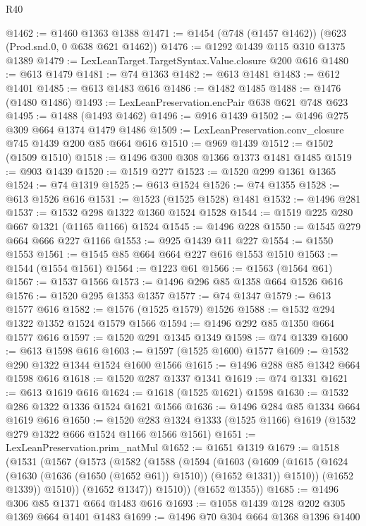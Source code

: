 \begin{lexlean}{R40}
\begin{coremodule}
@1462 := @1460 @1363 @1388
@1471 := @1454 (@748 (@1457 @1462)) (@623 (Prod.snd.{0, 0} @638 @621 @1462))
@1476 := @1292 @1439 @115 @310 @1375 @1389
@1479 := LexLeanTarget.TargetSyntax.Value.closure @200 @616
@1480 := @613 @1479
@1481 := @74 @1363
@1482 := @613 @1481
@1483 := @612 @1401
@1485 := @613 @1483 @616
@1486 := @1482 @1485
@1488 := @1476 (@1480 @1486)
@1493 := LexLeanPreservation.encPair @638 @621 @748 @623
@1495 := @1488 (@1493 @1462)
@1496 := @916 @1439
@1502 := @1496 @275 @309 @664 @1374 @1479 @1486
@1509 := LexLeanPreservation.conv_closure @745 @1439 @200 @85 @664 @616
@1510 := @969 @1439
@1512 := @1502 (@1509 @1510)
@1518 := @1496 @300 @308 @1366 @1373 @1481 @1485
@1519 := @903 @1439
@1520 := @1519 @277
@1523 := @1520 @299 @1361 @1365
@1524 := @74 @1319
@1525 := @613 @1524
@1526 := @74 @1355
@1528 := @613 @1526 @616
@1531 := @1523 (@1525 @1528) @1481
@1532 := @1496 @281
@1537 := @1532 @298 @1322 @1360 @1524 @1528
@1544 := @1519 @225 @280 @667 @1321 (@1165 @1166) @1524
@1545 := @1496 @228
@1550 := @1545 @279 @664 @666 @227 @1166
@1553 := @925 @1439 @11 @227
@1554 := @1550 @1553
@1561 := @1545 @85 @664 @664 @227 @616 @1553 @1510
@1563 := @1544 (@1554 @1561)
@1564 := @1223 @61
@1566 := @1563 (@1564 @61)
@1567 := @1537 @1566
@1573 := @1496 @296 @85 @1358 @664 @1526 @616
@1576 := @1520 @295 @1353 @1357
@1577 := @74 @1347
@1579 := @613 @1577 @616
@1582 := @1576 (@1525 @1579) @1526
@1588 := @1532 @294 @1322 @1352 @1524 @1579 @1566
@1594 := @1496 @292 @85 @1350 @664 @1577 @616
@1597 := @1520 @291 @1345 @1349
@1598 := @74 @1339
@1600 := @613 @1598 @616
@1603 := @1597 (@1525 @1600) @1577
@1609 := @1532 @290 @1322 @1344 @1524 @1600 @1566
@1615 := @1496 @288 @85 @1342 @664 @1598 @616
@1618 := @1520 @287 @1337 @1341
@1619 := @74 @1331
@1621 := @613 @1619 @616
@1624 := @1618 (@1525 @1621) @1598
@1630 := @1532 @286 @1322 @1336 @1524 @1621 @1566
@1636 := @1496 @284 @85 @1334 @664 @1619 @616
@1650 := @1520 @283 @1324 @1333 (@1525 @1166) @1619 (@1532 @279 @1322 @666 @1524 @1166 @1566 @1561)
@1651 := LexLeanPreservation.prim_natMul
@1652 := @1651 @1319
@1679 := @1518
    (@1531
      (@1567
        (@1573
          (@1582
            (@1588
              (@1594
                (@1603
                  (@1609
                    (@1615 (@1624 (@1630 (@1636 (@1650 (@1652 @61)) @1510)) (@1652 @1331)) @1510))
                  (@1652 @1339))
                @1510))
            (@1652 @1347))
          @1510))
      (@1652 @1355))
@1685 := @1496 @306 @85 @1371 @664 @1483 @616
@1693 := @1058 @1439 @128 @202 @305 @1369 @664 @1401 @1483
@1699 := @1496 @70 @304 @664 @1368 @1396 @1400

\end{coremodule}
\end{lexlean}
